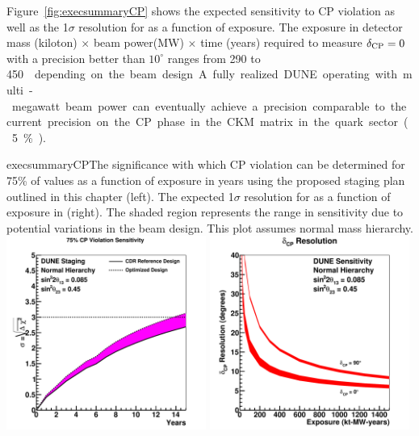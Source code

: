 Figure~\ref{fig:execsummaryCP} shows the expected sensitivity to CP
violation as well as the 1$\sigma$ resolution for \deltacp as a
function of exposure.  The exposure in detector mass (kiloton) $\times$ beam
power(MW) $\times$ time (years) required to measure $\delta_{\rm CP} = 0 $ with a
precision better than $10^\circ$ ranges from 290 to \SI{450}\ktMWyr{}
depending on the beam design.  
A fully realized 
DUNE operating with multi-megawatt 
beam power can eventually achieve a precision 
comparable to the current precision on the CP phase in the
CKM matrix in the quark sector (5\%).
%
\begin{cdrfigure}{execsummaryCP}{The
    significance with which CP violation can be determined for 75\% of
    \deltacp values as a function of exposure in years using the
    proposed staging plan outlined in this chapter (left). The
    expected 1$\sigma$ resolution for \deltacp as a function of
    exposure in \ktMWyr{} %
    (right). The shaded region represents the
    range in sensitivity due to potential variations in the beam
    design. This plot assumes normal mass hierarchy.}
\includegraphics[width=0.49\textwidth]{volume-physics/figures/cpv75_exp_staging15yr}
 \includegraphics[width=0.49\textwidth]{volume-physics/figures/res_dcp_exp}
\end{cdrfigure}


